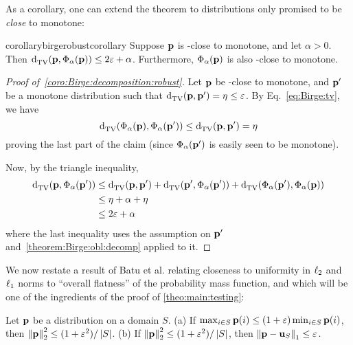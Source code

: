 \noindent As a corollary, one can extend the theorem to distributions only promised to be \emph{close} to monotone:
\begin{restatable}{corollary}{birgerobustcorollary}\label{coro:Birge:decomposition:robust}
    Suppose $\D$ is \eps-close to monotone, and let $\alpha > 0$. Then $\totalvardist{\D}{ \birge[\D]{\alpha} } \leq 2\eps + \alpha$. Furthermore,  $\birge[\D]{\alpha}$ is also \eps-close to monotone.
\end{restatable}
\begin{proof}[Proof of~\cref{coro:Birge:decomposition:robust}]
  Let $\D$ be \eps-close to monotone, and $\D^\prime$ be a monotone distribution such that $\totalvardist{\D}{\D^\prime} = \eta \leq \eps$. By Eq.~\eqref{eq:Birge:tv}, we have
  \begin{equation}\label{eqn:phialpha:cannot:increase:tv}
      \totalvardist{ \birge[\D]{\alpha} }{ \birge[\D^\prime]{\alpha} } \leq \totalvardist{\D}{\D^\prime} = \eta
  \end{equation}
  proving the last part of the claim  (since $\birge[\D^\prime]{\alpha}$ is easily seen to be monotone).

  \noindent Now, by the triangle inequality,
  \begin{align*}
      \totalvardist{\D}{ \birge[\D^\prime]{\alpha} } &\leq \totalvardist{\D}{\D^\prime} + \totalvardist{\D^\prime}{ \birge[\D^\prime]{\alpha} } + \totalvardist{ \birge[\D^\prime]{\alpha} }{ \birge[\D]{\alpha} } \\
      &\leq \eta + \alpha + \eta \\
      &\leq 2\eps+\alpha
  \end{align*}
  where the last inequality uses the assumption on $\D^\prime$ and~\cref{theorem:Birge:obl:decomp} applied to it.
\end{proof}
  
We now restate a result of Batu et al. relating closeness to uniformity in $\lp[2]$ and $\lp[1]$ norms to ``overall flatness'' of the probability mass function, and which will be one of the ingredients of the proof of \cref{theo:main:testing}:
\begin{lemma}\label{lemma:small:l2:close:uniform:l1}
Let $\D$ be a distribution on a domain $S$. \textsf{(a)} If $\max_{i\in S} \D(i) \leq (1+\eps)\min_{i\in S} \D(i)$, then $\normtwo{\D}^2 \leq (1+\eps^2)/\abs{S}$. \textsf{(b)} If $\normtwo{\D}^2 \leq (1+\eps^2)/\abs{S}$, then $\normone{\D-\uniform_{S}} \leq \eps$.
\end{lemma}

